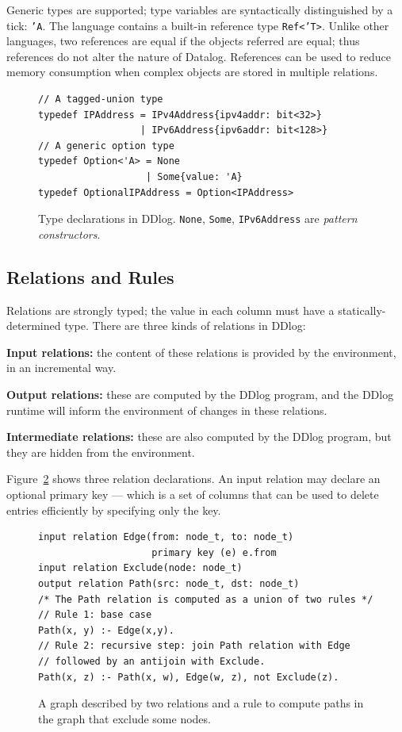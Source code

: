 Generic types are supported; type variables are syntactically
distinguished by a tick: \texttt{'A}.  The language
contains a built-in reference type \texttt{Ref<'T>}.  Unlike other
languages, two references are equal if the objects referred are equal;
thus references do not alter the nature of Datalog.  References can be
used to reduce memory consumption when complex objects are stored in
multiple relations.

\begin{figure}[t]
  \footnotesize
\begin{lstlisting}[language=ddlog]
// A tagged-union type
typedef IPAddress = IPv4Address{ipv4addr: bit<32>}
                  | IPv6Address{ipv6addr: bit<128>}
// A generic option type
typedef Option<'A> = None
                   | Some{value: 'A}
typedef OptionalIPAddress = Option<IPAddress>
\end{lstlisting}
\caption{Type declarations in DDlog.  \texttt{None}, \texttt{Some},
\texttt{IPv6Address} are \emph{pattern constructors}.\label{fig:types}}
\end{figure}

\subsection{Relations and Rules}

Relations are strongly typed; the value in each column must have a
statically-determined type.  There are three kinds of relations in
DDlog:

\noindent \textbf{Input relations:} the content of these relations is provided by
the environment, in an incremental way.

\noindent \textbf{Output relations:} these are computed by the DDlog
program, and the DDlog runtime will inform the environment of changes
in these relations.

\noindent \textbf{Intermediate relations:} these are also computed by
the DDlog program, but they are hidden from the environment.

Figure~\ref{fig:relations-rules} shows three relation declarations.
An input relation may declare an optional primary key --- which is a
set of columns that can be used to delete entries efficiently by
specifying only the key.

\begin{figure}[t]
  \small
  \begin{lstlisting}[language=ddlog]
input relation Edge(from: node_t, to: node_t)
                    primary key (e) e.from
input relation Exclude(node: node_t)
output relation Path(src: node_t, dst: node_t)
/* The Path relation is computed as a union of two rules */
// Rule 1: base case
Path(x, y) :- Edge(x,y).
// Rule 2: recursive step: join Path relation with Edge
// followed by an antijoin with Exclude.
Path(x, z) :- Path(x, w), Edge(w, z), not Exclude(z).
  \end{lstlisting}
  \caption{A graph described by two relations and a rule to compute
    paths in the graph that exclude some nodes.\label{fig:relations-rules}}
\end{figure}

